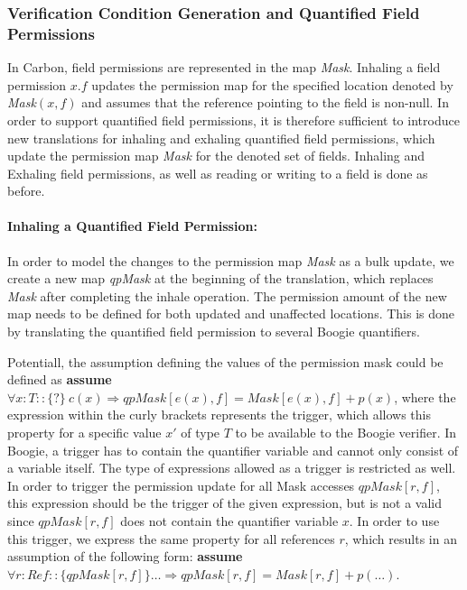 \documentclass[12pt]{article}
\begin{document}
\subsubsection{Verification Condition Generation and Quantified Field Permissions}
\label{cgqf}
In Carbon, field permissions are represented in the map \textit{Mask}. Inhaling a field permission \(x.f\) updates the permission map for the specified location denoted by \textit{Mask}\((x, f)\) and assumes  that the reference pointing to the field is non-null. In order to support quantified field permissions, it is therefore sufficient to introduce new translations for inhaling and exhaling quantified field permissions, which update the permission map \textit{Mask} for the denoted set of fields.
Inhaling and Exhaling field permissions, as well as reading or writing to a field is done as before.

\paragraph{Inhaling a Quantified Field Permission: }
In order to model the changes to the permission map \textit{Mask} as a bulk update, we create a new map \textit{qpMask} at the beginning of the translation, which replaces \textit{Mask} after completing the inhale operation. The permission amount of the new map needs to be defined for both updated and unaffected locations. This is done by translating the quantified field permission to several Boogie quantifiers. 

Potentiall, the assumption defining the values of the permission mask could be defined as \textbf{assume} \(\forall x:T :: \{?\}\ c(x) \Rightarrow qpMask[e(x), f] = Mask[e(x), f] + p(x)\), where the expression within the curly brackets represents the trigger, which allows this property for a specific value \(x'\) of type \(T\) to be available to the Boogie verifier. In Boogie, a trigger has to contain the quantifier variable and cannot only consist of a variable itself. The type of expressions allowed as a trigger is restricted as well. In order to trigger the permission update for all Mask accesses \(qpMask[r, f] \), this expression should be the trigger of the given expression, but is not a valid since  \(qpMask[r, f] \) does not contain the quantifier variable \(x\). 
In order to use this trigger, we express the same property for all references \(r\), which results in an assumption of the following form: \textbf{assume} \(\forall r:Ref :: \{qpMask[r, f]\} \dots \Rightarrow qpMask[r, f] = Mask[r, f] + p(\dots)\).
\end{document}
